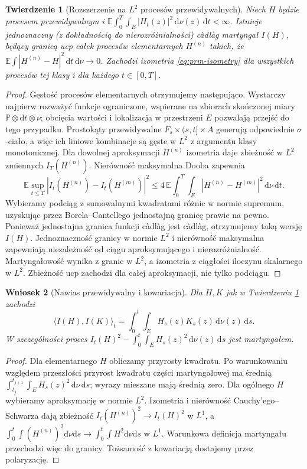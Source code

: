 \documentclass[11pt,a4paper,oneside]{report}
\numberwithin{equation}{chapter}
\theoremstyle{plain}
\newtheorem{twierdzenie}{Twierdzenie}[chapter]
\newtheorem{wniosek}[twierdzenie]{Wniosek}
\theoremstyle{definition}
\theoremstyle{remark}
\newcommand{\Prob}{\mathbb{P}}
\newcommand{\E}{\mathbb{E}}
\newcommand{\dd}{\mathrm{d}}
\begin{document}
\begin{twierdzenie}[Rozszerzenie na $L^2$ procesów przewidywalnych]
\label{th:prm-extend}
Niech $H$ będzie procesem przewidywalnym i
$\E\int_0^T\int_E |H_t(z)|^2\,\dd\nu(z)\,\dd t<\infty$.
Istnieje jednoznaczny (z dokładnością do nierozróżnialności)
càdlàg martyngał $I(H)$, będący granicą ucp całek
procesów elementarnych $H^{(n)}$ takich, że
$\E\int|H^{(n)}-H|^2\,\dd t\,\dd\nu\to0$.
Zachodzi izometria \eqref{eq:prm-isometry} dla wszystkich
procesów tej klasy i dla każdego $t\in[0,T]$.
\end{twierdzenie}
\begin{proof}
Gęstość procesów elementarnych otrzymujemy następująco.
Wystarczy najpierw rozważyć funkcje ograniczone, wspierane
na zbiorach skończonej miary $\Prob\otimes\dd t\otimes\nu$;
obcięcia wartości i lokalizacja w przestrzeni $E$ pozwalają
przejść do tego przypadku. Prostokąty przewidywalne
$F_s\times(s,t]\times A$ generują odpowiednie $\sigma$-ciało,
a więc ich liniowe kombinacje są gęste w $L^2$ z
argumentu klasy monotonicznej. Dla dowolnej aproksymacji
$H^{(n)}$ izometria daje zbieżność w $L^2$ zmiennych
$I_T(H^{(n)})$. Nierówność maksymalna Dooba zapewnia
\[
\E\sup_{t\le T}|I_t(H^{(n)})-I_t(H^{(m)})|^2
\le4\,\E\int_0^T\int_E|H^{(n)}-H^{(m)}|^2
\,\dd\nu\,\dd t.
\]
Wybieramy podciąg z sumowalnymi kwadratami różnic
w normie supremum, uzyskując przez Borela--Cantellego
jednostajną granicę prawie na pewno. Ponieważ jednostajna
granica funkcji càdlàg jest càdlàg, otrzymujemy taką
wersję $I(H)$. Jednoznaczność granicy w normie $L^2$
i nierówność maksymalna zapewniają niezależność od ciągu
aproksymującego i nierozróżnialność. Martyngałowość
wynika z granic w $L^2$, a izometria z ciągłości iloczynu
skalarnego w $L^2$. Zbieżność ucp zachodzi dla całej
aproksymacji, nie tylko podciągu.
\end{proof}

\begin{wniosek}[Nawias przewidywalny i kowariacja]
\label{cor:prm-angle}
Dla $H,K$ jak w Twierdzeniu \ref{th:prm-extend} zachodzi
\[
\langle I(H),I(K)\rangle_t
=\int_0^t\int_EH_s(z)K_s(z)\,\dd\nu(z)\,\dd s.
\]
W szczególności proces $I_t(H)^2-\int_0^t\int_EH_s(z)^2
\,\dd\nu(z)\,\dd s$ jest martyngałem.
\end{wniosek}
\begin{proof}
Dla elementarnego $H$ obliczamy przyrosty kwadratu.
Po warunkowaniu względem przeszłości przyrost kwadratu
części martyngałowej ma średnią
$\int_{t_j}^{t_{j+1}}\int_EH_s(z)^2\,\dd\nu\,\dd s$;
wyrazy mieszane mają średnią zero. Dla ogólnego $H$
wybieramy aproksymację w normie $L^2$. Izometria i
nierówność Cauchy'ego--Schwarza dają zbieżność
$I_t(H^{(n)})^2\to I_t(H)^2$ w $L^1$, a
$\int_0^t\int(H^{(n)})^2\dd\nu\dd s\to
\int_0^t\int H^2\dd\nu\dd s$ w $L^1$.
Warunkowa definicja martyngału przechodzi więc do granicy.
Tożsamość z kowariacją dostajemy przez polaryzację.
\end{proof}
\end{document}
